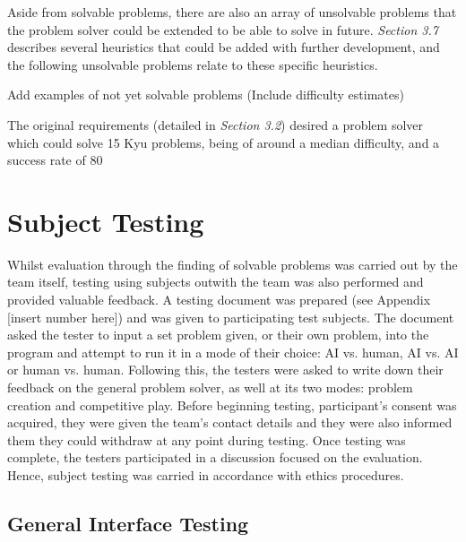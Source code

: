 \documentclass{l3proj}
\begin{document}
Aside from solvable problems, there are also an array of unsolvable problems that the problem solver could be extended to be able to solve in future. \textit{Section 3.7} describes several heuristics that could be added with further development, and the following unsolvable problems relate to these specific heuristics.

Add examples of not yet solvable problems (Include difficulty estimates)

The original requirements (detailed in \textit{Section 3.2}) desired a problem solver which could solve 15 Kyu problems, being of around a median difficulty, and a success rate of 80%

\section{Subject Testing}

Whilst evaluation through the finding of solvable problems was carried out by the team itself, testing using subjects outwith the team was also performed and provided valuable feedback. A testing document was prepared (see Appendix [insert number here]) and was given to participating test subjects. The document asked the tester to input a set problem given, or their own problem, into the program and attempt to run it in a mode of their choice: AI vs. human, AI vs. AI or human vs. human. Following this, the testers were asked to write down their feedback on the general problem solver, as well at its two modes: problem creation and competitive play. Before beginning testing, participant's consent was acquired, they were given the team's contact details and they were also informed them they could withdraw at any point during testing. Once testing was complete, the testers participated in a discussion focused on the evaluation. Hence, subject testing was carried in accordance with ethics procedures.

\subsection{General Interface Testing}
\end{document}
